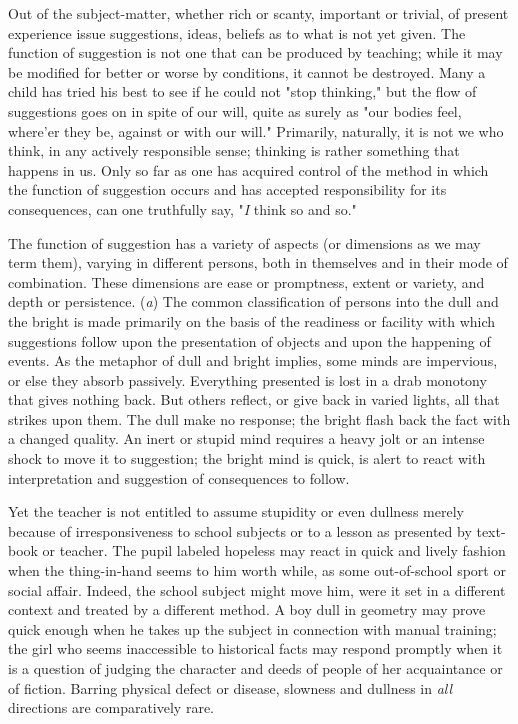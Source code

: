 \documentclass[letterpaper]{book}
\begin{document}
Out of the subject-matter, whether rich or scanty, important or trivial,
of present experience issue suggestions, ideas, beliefs as to what is
not yet given. The function of suggestion is not one that can be
produced by teaching; while it may be modified for better or worse by
conditions, it cannot be destroyed. Many a child has tried his best to
see if he could not "stop thinking," but the flow of suggestions goes on
in spite of our will, quite as surely as "our bodies feel, where'er they
be, against or with our will." Primarily, naturally, it is not we who
think, in any actively responsible sense; thinking is rather something
that happens in us. Only so far as one has acquired control of the
method in which the function of suggestion occurs and has accepted
responsibility for its consequences, can one truthfully say, "\emph{I}
think so and so."



The function of suggestion has a variety of aspects (or dimensions as we
may term them), varying in different persons, both in themselves and in
their mode of combination. These dimensions are ease or promptness,
extent or variety, and depth or persistence. (\emph{a}) The common
classification of persons into the dull and the bright is made primarily
on the basis of the readiness or facility with which suggestions follow
upon the
presentation
of objects and upon the happening of events. As the metaphor of dull and
bright implies, some minds are impervious, or else they absorb
passively. Everything presented is lost in a drab monotony that gives
nothing back. But others reflect, or give back in varied lights, all
that strikes upon them. The dull make no response; the bright flash back
the fact with a changed quality. An inert or stupid mind requires a
heavy jolt or an intense shock to move it to suggestion; the bright mind
is quick, is alert to react with interpretation and suggestion of
consequences to follow.

Yet the teacher is not entitled to assume stupidity or even dullness
merely because of irresponsiveness to school subjects or to a lesson as
presented by text-book or teacher. The pupil labeled hopeless may react
in quick and lively fashion when the thing-in-hand seems to him worth
while, as some out-of-school sport or social affair. Indeed, the school
subject might move him, were it set in a different context and treated
by a different method. A boy dull in geometry may prove quick enough
when he takes up the subject in connection with manual training; the
girl who seems inaccessible to historical facts may respond promptly
when it is a question of judging the character and deeds of people of
her acquaintance or of fiction. Barring physical defect or disease,
slowness and dullness in \emph{all} directions are comparatively rare.
\end{document}
